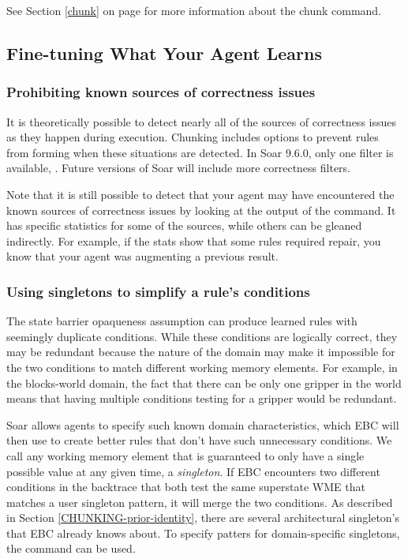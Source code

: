 See Section \ref{chunk} on page \pageref{chunk} for more information about the chunk command.


\subsection{Fine-tuning What Your Agent Learns}
\label{CHUNKING-usage-tuning}

\subsubsection{Prohibiting known sources of correctness issues}
\label{CHUNKING-usage-tuning-correctness}

It is theoretically possible to detect nearly all of the sources of correctness issues as they happen during execution.  Chunking includes options to prevent rules from forming when these situations are detected.  In Soar 9.6.0, only one filter is available, .  Future versions of Soar will include more correctness filters.

Note that it is still possible to detect that your agent may have encountered the known sources of correctness issues by looking at the output of the  command.  It has specific statistics for some of the sources, while others can be gleaned indirectly.  For example, if the stats show that some rules required repair, you know that your agent was augmenting a previous result.

\subsubsection{Using singletons to simplify a rule's conditions}
\label{CHUNKING-usage-tuning-conditions}

The state barrier opaqueness assumption can produce learned rules with seemingly duplicate conditions.  While these conditions are logically correct, they may be redundant because the nature of the domain may make it impossible for the two conditions to match different working memory elements.  For example, in the blocks-world domain, the fact that there can be only one gripper in the world means that having multiple conditions testing for a gripper would be redundant.  

Soar allows agents to specify such known domain characteristics, which EBC will then use to create better rules that don't have such unnecessary conditions.  We call any working memory element that is guaranteed to only have a single possible value at any given time, a \textit{singleton}.  If EBC encounters two different conditions in the backtrace that both test the same superstate WME that matches a user singleton pattern, it will merge the two conditions. As described in Section \ref{CHUNKING-prior-identity}, there are several architectural singleton's that EBC already knows about.  To specify patters for domain-specific singletons, the  command can be used. 

